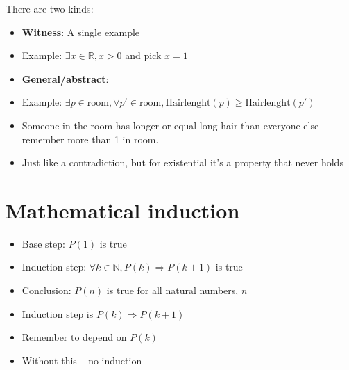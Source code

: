 \documentclass[english,10pt,a4paper]{article}
\begin{document}
\begin{theo} 
 There are two kinds:
\begin{itemize}
\item \textbf{Witness}: A single example
\item[] Example: $\exists x \in \mathbb{R}, x > 0$ and pick $x=1$
\item \textbf{General/abstract}: 
\item[] Example: $\exists p \in \text{room}, \forall p' \in \text{room}, \text{Hairlenght}(p) \geq \text{Hairlenght}(p')$
\item[] Someone in the room has longer or equal long hair than everyone else -- remember more than 1 in room.
\end{itemize}
\end{theo}


\begin{theo} 
\begin{itemize}
\item Just like a contradiction, but for existential it's a property that never holds
\end{itemize}
\end{theo}




\newpage
\section{Mathematical induction}

\begin{theo}[] 
\begin{itemize}
\item Base step: $P(1)$ is true
\item Induction step: $\forall k \in \mathbb{N}, P(k) \Rightarrow P(k+1)$ is true
\item Conclusion: $P(n)$ is true for all natural numbers, $n$
\end{itemize}
\end{theo}


\begin{theo} 
\begin{itemize}
\item Induction step is $P(k) \Rightarrow P(k+1)$
\item Remember to depend on $P(k)$
\item Without this -- no induction
\end{itemize}
\end{theo}
\end{document}
